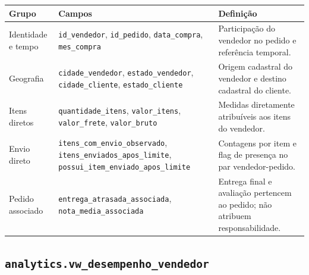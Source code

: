 \documentclass[12pt,a4paper]{article}
\newcounter{none}
\begin{document}
{\def\LTcaptype{none} %
\begin{longtable}[]{@{}
  >{\raggedright\arraybackslash}p{}
  >{\raggedright\arraybackslash}p{}
  >{\raggedright\arraybackslash}p{}@{}}
\toprule\noalign{}
\rowcolor{AzulCorporativo}
\begin{minipage}[b]{\linewidth}\raggedright\color{white}\bfseries
Grupo
\end{minipage} & \begin{minipage}[b]{\linewidth}\raggedright\color{white}\bfseries
Campos
\end{minipage} & \begin{minipage}[b]{\linewidth}\raggedright\color{white}\bfseries
Definição
\end{minipage} \\
\midrule\noalign{}
\endhead
\bottomrule\noalign{}
\endlastfoot
Identidade e tempo & \nolinkurl{id_vendedor}, \nolinkurl{id_pedido},
\nolinkurl{data_compra}, \nolinkurl{mes_compra} & Participação do
vendedor no pedido e referência temporal. \\
Geografia & \nolinkurl{cidade_vendedor}, \nolinkurl{estado_vendedor},
\nolinkurl{cidade_cliente}, \nolinkurl{estado_cliente} & Origem
cadastral do vendedor e destino cadastral do cliente. \\
Itens diretos & \nolinkurl{quantidade_itens}, \nolinkurl{valor_itens},
\nolinkurl{valor_frete}, \nolinkurl{valor_bruto} & Medidas diretamente
atribuíveis aos itens do vendedor. \\
Envio direto & \nolinkurl{itens_com_envio_observado},
\nolinkurl{itens_enviados_apos_limite},
\nolinkurl{possui_item_enviado_apos_limite} & Contagens por item e flag
de presença no par vendedor-pedido. \\
Pedido associado & \nolinkurl{entrega_atrasada_associada},
\nolinkurl{nota_media_associada} & Entrega final e avaliação pertencem
ao pedido; não atribuem responsabilidade. \\
\end{longtable}
}

\subsection{\texorpdfstring{\nolinkurl{analytics.vw_desempenho_vendedor}}{}}\label{docs__analytics__estruturas_schema_analytics.md__analytics.vw_desempenho_vendedor}
\end{document}
